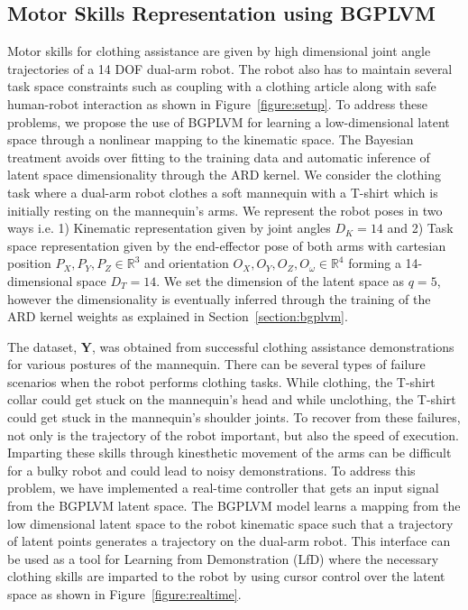 \documentclass{article}
\begin{document}
\subsection{Motor Skills Representation using BGPLVM}
\label{section:controller}

Motor skills for clothing assistance are given by high dimensional joint angle trajectories of a 14 DOF dual-arm robot. The robot also has to maintain several task space constraints such as coupling with a clothing article along with safe human-robot interaction as shown in Figure~\ref{figure:setup}. To address these problems, we propose the use of BGPLVM for learning a low-dimensional latent space through a nonlinear mapping to the kinematic space. The Bayesian treatment avoids over fitting to the training data and automatic inference of latent space dimensionality through the ARD kernel. We consider the clothing task where a dual-arm robot clothes a soft mannequin with a T-shirt which is initially resting on the mannequin's arms. We represent the robot poses in two ways i.e. 1) Kinematic representation given by joint angles $D_K = 14$ and 2) Task space representation given by the end-effector pose of both arms with cartesian position ${P_X,P_Y,P_Z} \in \mathbb{R}^3$ and orientation ${O_X,O_Y,O_Z,O_{\omega}} \in \mathbb{R}^4$ forming a 14-dimensional space $D_T = 14$. We set the dimension of the latent space as $q = 5$, however the dimensionality is eventually inferred through the training of the ARD kernel weights as explained in Section~\ref{section:bgplvm}.

The dataset, $\mathbf{Y}$, was obtained from successful clothing assistance demonstrations for various postures of the mannequin. There can be several types of failure scenarios when the robot performs clothing tasks. While clothing, the T-shirt collar could get stuck on the mannequin's head and while unclothing, the T-shirt could get stuck in the mannequin's shoulder joints. To recover from these failures, not only is the trajectory of the robot important, but also the speed of execution. Imparting these skills through kinesthetic movement of the arms can be difficult for a bulky robot and could lead to noisy demonstrations. To address this problem, we have implemented a real-time controller that gets an input signal from the BGPLVM latent space. The BGPLVM model learns a mapping from the low dimensional latent space to the robot kinematic space such that a trajectory of latent points generates a trajectory on the dual-arm robot. This interface can be used as a tool for Learning from Demonstration (LfD) where the necessary clothing skills are imparted to the robot by using cursor control over the latent space as shown in Figure~\ref{figure:realtime}.
\end{document}
